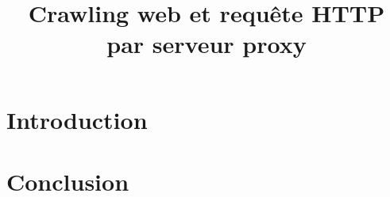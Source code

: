 \documentclass[hideweeklyreports,noposter]{polytech/polytech}
\title{Crawling web et requête HTTP par serveur proxy}
\begin{document}
\part{Introduction}
\part{Conclusion}

\appendix		
\end{document}
